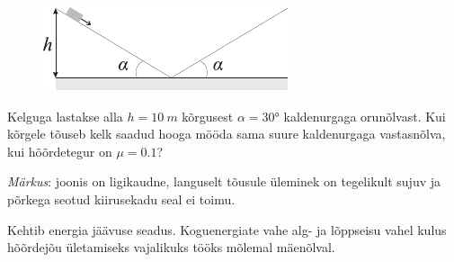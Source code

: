
\begin{figure}
	\begin{center}
		\vspace{-20pt}
		\hspace{-10pt}
		\includegraphics[width=\linewidth]{2008-lahg-02-yl}
	\end{center}
\end{figure}
Kelguga lastakse alla $h = \SI{10}{m}$ kõrgusest $\alpha = \ang{30}$ kaldenurgaga orunõlvast. Kui kõrgele tõuseb kelk saadud hooga mööda sama suure kaldenurgaga vastasnõlva, kui hõõrdetegur on $\mu = \num{0,1}$? 

\emph{Märkus}: joonis on ligikaudne, languselt tõusule üleminek on tegelikult sujuv ja põrkega seotud kiirusekadu seal ei toimu.

\hint
Kehtib energia jäävuse seadus. Koguenergiate vahe alg- ja lõppseisu vahel kulus hõõrdejõu ületamiseks vajalikuks tööks mõlemal mäenõlval.

